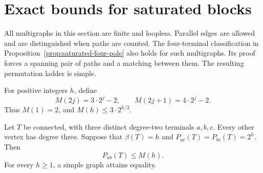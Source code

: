 \section{Exact bounds for saturated blocks}
\label{sec:second-order-saturated-blocks}

All multigraphs in this section are finite and loopless.
Parallel edges are allowed and are distinguished when paths are counted.
The four-terminal classification in Proposition~\ref{prop:saturated-four-pole}
also holds for such multigraphs.
Its proof forces a spanning pair of paths and a matching between them.
The resulting permutation ladder is simple.

For positive integers $h$, define
\[
 M(2j)=3\cdot2^j-2,\qquad
 M(2j+1)=4\cdot2^j-2.
\]
Thus $M(1)=2$, and $M(h)\le3\cdot2^{h/2}$.

\begin{theorem}\label{thm:saturated-three-pole}
Let $T$ be connected, with three distinct degree-two terminals $a,b,c$.
Every other vertex has degree three.
Suppose that $\beta(T)=h$ and
$P_{ac}(T)=P_{bc}(T)=2^h$.
Then
\[
 P_{ab}(T)\le M(h).
\]
For every $h\ge1$, a simple graph attains equality.
\end{theorem}

